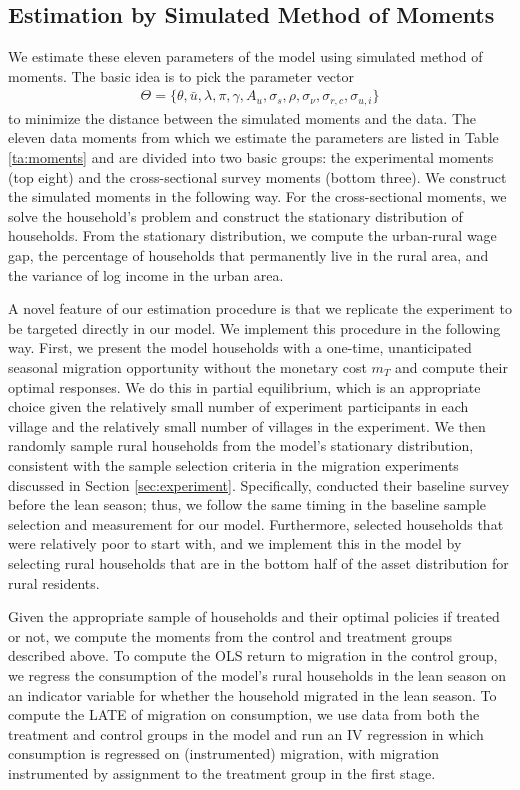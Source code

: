 \documentclass[12pt,pdftex]{article}
\begin{document}
\subsection{Estimation by Simulated Method of Moments}

We estimate these eleven parameters of the model using simulated method of moments. The basic idea is to pick the parameter vector
\begin{align}
\Theta = \{\theta, \bar u, \lambda, \pi, \gamma, A_u, \sigma_s, \rho, \sigma_{\nu}, \sigma_{r,c}, \sigma_{u,i}\}
\end{align}
to minimize the distance between the simulated moments and the data. The eleven data moments from which we estimate the parameters are listed in Table \ref{ta:moments} and are divided into two basic groups: the experimental moments (top eight) and the cross-sectional survey moments (bottom three). We construct the simulated moments in the following way. For the cross-sectional moments, we solve the household's problem and construct the stationary distribution of households. From the stationary distribution, we compute the urban-rural wage gap, the percentage of households that permanently live in the rural area, and the variance of log income in the urban area.

A novel feature of our estimation procedure is that we replicate the experiment to be targeted directly in our model. We implement this procedure in the following way. First, we present the model households with a one-time, unanticipated seasonal migration opportunity without the monetary cost $m_T$ and compute their optimal responses. We do this in partial equilibrium, which is an appropriate choice given the relatively small number of experiment participants in each village and the relatively small number of villages in the experiment. We then randomly sample rural households from the model's stationary distribution, consistent with the sample selection criteria in the migration experiments discussed in Section \ref{sec:experiment}. Specifically, \citet{brch14} conducted their baseline survey before the lean season; thus, we follow the same timing in the baseline sample selection and measurement for our model. Furthermore, \citet{brch14} selected households that were relatively poor to start with, and we implement this in the model by selecting rural households that are in the bottom half of the asset distribution for rural residents.

Given the appropriate sample of households and their optimal policies if treated or not, we compute the moments from the control and treatment groups described above. To compute the OLS return to migration in the control group, we regress the consumption of the model's rural households in the lean season on an indicator variable for whether the household migrated in the lean season. To compute the LATE of migration on consumption, we use data from both the treatment and control groups in the model and run an IV regression in which consumption is regressed on (instrumented) migration, with migration instrumented by assignment to the treatment group in the first stage.
\end{document}
